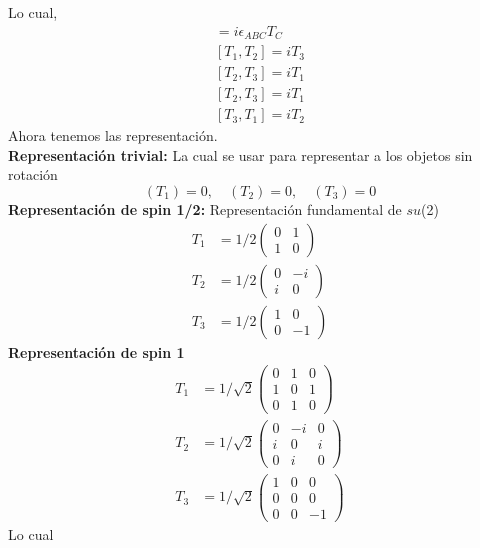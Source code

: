 Lo cual,
\begin{align*}
  [T_A,T_B] = i\epsilon_{ABC}T_C \\
  [T_1,T_2] =iT_3 \\
  [T_2,T_3] = iT_1 \\
  [T_2,T_3] = iT_1 \\
  [T_3,T_1] = iT_2
\end{align*}
Ahora tenemos las representación.\\
\textbf{Representación trivial: } La cual se usar para representar a los objetos sin rotación
\begin{equation*}
  (T_1)= 0,\quad (T_2)= 0,\quad (T_3)=0
\end{equation*}
\textbf{Representación de spin 1/2:} Representación fundamental de $su$(2)
\begin{align*}
  T_1 & = 1/2\begin{pmatrix} 0 & 1 \\ 1 & 0 \end{pmatrix} \\
  T_2 & = 1/2\begin{pmatrix}0 & -i \\ i & 0 \end{pmatrix} \\
  T_3 & = 1/2\begin{pmatrix} 1 & 0 \\ 0 & -1 \end{pmatrix}
\end{align*}
\textbf{Representación de spin 1}
\begin{align*}
  T_1 & = 1/\sqrt{2}\begin{pmatrix} 0 & 1 & 0 \\ 1 & 0 & 1 \\ 0 & 1 & 0 \end{pmatrix} \\
  T_2 & = 1/\sqrt{2}\begin{pmatrix} 0 & -i & 0 \\ i & 0 & i \\ 0 & i & 0 \end{pmatrix} \\
  T_3 & = 1/\sqrt{2}\begin{pmatrix} 1 & 0 & 0 \\ 0 & 0 & 0 \\ 0 & 0 & -1 \end{pmatrix}
\end{align*}
Lo cual
